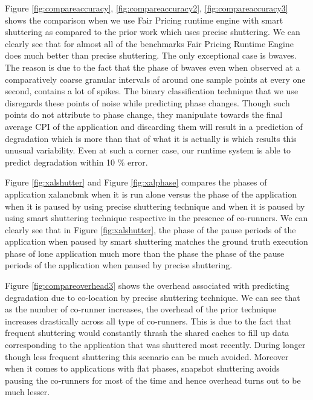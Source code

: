 \documentclass[pageno]{jpaper}
\begin{document}
\vspace{-3 mm} Figure \ref{fig:compareaccuracy}, \ref{fig:compareaccuracy2}, \ref{fig:compareaccuracy3} shows the comparison when we use Fair Pricing runtime engine with smart shuttering as compared to the prior work which uses precise shuttering. We can clearly see that for almost all of the benchmarks Fair Pricing Runtime Engine does much better than precise shuttering. The only exceptional case is bwaves. The reason is due to the fact that the phase of bwaves even when observed at a comparatively coarse granular intervals of around one sample points at every one second, contains a lot of spikes. The binary classification technique that we use disregards these points of noise while predicting phase changes.  Though such points do not attribute to phase change, they manipulate towards the final average CPI of the application and discarding them will result in a prediction of degradation which is more than that of what it is actually is which results this unusual variability. Even at such a corner case, our runtime system is able to predict degradation within 10 \% error.

Figure \ref{fig:xalshutter} and Figure \ref{fig:xalphase} compares the phases of application xalancbmk when it is run alone versus the phase of the application when it is paused by using precise shuttering technique and when it is paused by using smart shuttering technique respective in the presence of co-runners. We can clearly see that in Figure \ref{fig:xalshutter}, the phase of the pause periods of the application when paused by smart shuttering matches the ground truth execution phase of lone application much more than the phase the phase of the pause periods of the application when paused by precise shuttering.

Figure \ref{fig:compareoverhead3} shows the overhead associated with predicting degradation due to co-location by precise shuttering technique. We can see that as the number of co-runner increases, the overhead of the prior technique increases drastically across all type of co-runners. This is due to the fact that frequent shuttering would constantly thrash the shared caches to fill up data corresponding to the application that was shuttered most recently. During longer though less frequent shuttering this scenario can be much avoided. Moreover when it comes to applications with flat phases, snapshot shuttering avoids pausing the co-runners for most of the time and hence overhead turns out to be much lesser. \vspace{-1.9 mm}
\end{document}
